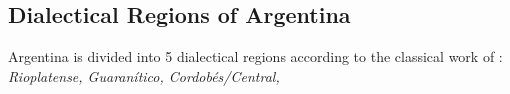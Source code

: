 \subsection{Dialectical Regions of Argentina}

Argentina is divided into 5 dialectical regions according to the classical work of \citet{vidal1964espanol}: \emph{Rioplatense, Guaranítico, Cordobés/Central, }


















